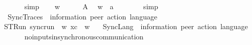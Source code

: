 \begin{isabellebody}
\ \ \ \ \isamarkupfalse%
\ simp\isanewline
\ \ \isamarkupfalse%
\ {\isachardoublequoteopen}w{\isasymdown}\isactrlsub {\isacharquery}{\kern0pt}\ {\isacharequal}{\kern0pt}\ {\isasymepsilon}{\isachardoublequoteclose}\isanewline
\ \ \isamarkupfalse%
\ A\ \isamarkupfalse%
\ {\isachardoublequoteopen}{\isacharparenleft}{\kern0pt}w\ {\isasymcdot}\ {\isacharbrackleft}{\kern0pt}a{\isacharbrackright}{\kern0pt}{\isacharparenright}{\kern0pt}{\isasymdown}\isactrlsub {\isacharquery}{\kern0pt}\ {\isacharequal}{\kern0pt}\ {\isasymepsilon}{\isachardoublequoteclose}\isanewline
\ \ \ \ \isamarkupfalse%
\ simp\isanewline
{}\isamarkupfalse%
%
\endisatagproof
{\isafoldproof}%
%
\isadelimproof
\isanewline
%
\endisadelimproof
\isanewline
{}\isamarkupfalse%
\ SyncTraces\ {\isacharcolon}{\kern0pt}{\isacharcolon}{\kern0pt}\ {\isachardoublequoteopen}{\isacharparenleft}{\kern0pt}{\isacharprime}{\kern0pt}information{\isacharcomma}{\kern0pt}\ {\isacharprime}{\kern0pt}peer{\isacharparenright}{\kern0pt}\ action\ language{\isachardoublequoteclose}\ \ {\isacharparenleft}{\kern0pt}{\isachardoublequoteopen}{\isasymT}\isactrlsub {\isasymzero}{\isachardoublequoteclose}\ {}{}{}{\isacharparenright}{\kern0pt}\ \isanewline
STRun{\isacharcolon}{\kern0pt}\ {\isachardoublequoteopen}sync{\isacharunderscore}{\kern0pt}run\ {\isasymC}\isactrlsub {\isasymI}\isactrlsub {\isasymzero}\ w\ xc\ {\isasymLongrightarrow}\ w\ {\isasymin}\ {\isasymT}\isactrlsub {\isasymzero}{\isachardoublequoteclose}\isanewline
\isanewline
{}\isamarkupfalse%
\ SyncLang\ {\isacharcolon}{\kern0pt}{\isacharcolon}{\kern0pt}\ {\isachardoublequoteopen}{\isacharparenleft}{\kern0pt}{\isacharprime}{\kern0pt}information{\isacharcomma}{\kern0pt}\ {\isacharprime}{\kern0pt}peer{\isacharparenright}{\kern0pt}\ action\ language{\isachardoublequoteclose}\ \ {\isacharparenleft}{\kern0pt}{\isachardoublequoteopen}{\isasymL}\isactrlsub {\isasymzero}{\isachardoublequoteclose}\ {}{}{}{\isacharparenright}{\kern0pt}\ \isanewline
\ \ {\isachardoublequoteopen}{\isasymL}\isactrlsub {\isasymzero}\ {\isasymequiv}\ {\isasymT}\isactrlsub {\isasymzero}{\isachardoublequoteclose}\isanewline
\isanewline
{}\isamarkupfalse%
\ no{\isacharunderscore}{\kern0pt}inputs{\isacharunderscore}{\kern0pt}in{\isacharunderscore}{\kern0pt}synchronous{\isacharunderscore}{\kern0pt}communication{\isacharcolon}{\kern0pt}\isanewline

\end{isabellebody}
